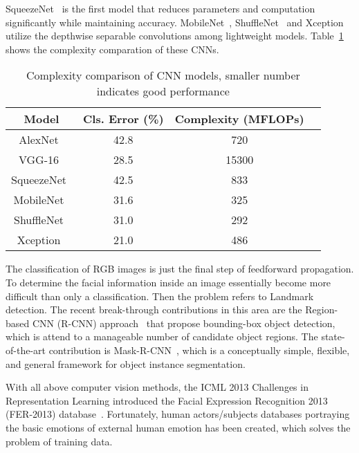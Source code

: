 SqueezeNet~\cite{iandola2016squeezenet} is the first model that reduces parameters and computation significantly while maintaining accuracy. MobileNet~\cite{howard2017mobilenets}, ShuffleNet~\cite{zhang2017shufflenet} and Xception~\cite{chollet2016xception} utilize the depthwise separable convolutions among lightweight models. Table~\ref{tab:cnn} shows the complexity comparation of these CNNs.

\begin{table}[htb]
  \caption{Complexity comparison of CNN models, smaller number indicates good performance}
  \label{tab:cnn}
  \scriptsize
  \begin{center}
    \begin{tabular}{cccc}
      Model & Cls. Error (\%) &  Complexity (MFLOPs) \\
    \hline
    AlexNet~\cite{Krizhevsky2012}                   & 42.8         &  720    \\
    VGG-16~\cite{Simonyan2015}                    & 28.5         & 15300 \\
    SqueezeNet~\cite{iandola2016squeezenet}                & 42.5         &  833    \\
    MobileNet~\cite{howard2017mobilenets}                 & 31.6         &  325    \\
    ShuffleNet~\cite{zhang2017shufflenet}                & 31.0         &  292    \\
    Xception~\cite{chollet2016xception}                  & 21.0         &  486
    \end{tabular}
  \end{center}
\end{table}

The classification of RGB images is just the final step of feedforward propagation. To determine the facial information inside an image essentially become more difficult than only a classification. Then the problem refers to Landmark detection.
The recent break-through contributions in this area are the Region-based CNN (R-CNN) approach~\cite{girshick2014rich} that propose bounding-box object detection, which is attend to a manageable number of candidate object regions. The state-of-the-art contribution is Mask-R-CNN~\cite{he2017mask}, which is a conceptually simple, flexible, and general framework for object instance segmentation.

With all above computer vision methods, the ICML 2013 Challenges in Representation Learning introduced the Facial Expression Recognition 2013 (FER-2013)
database~\cite{goodfellow2013challenges}. Fortunately, human actors/subjects databases portraying the basic emotions of external human emotion has been created, which solves the problem of training data.

